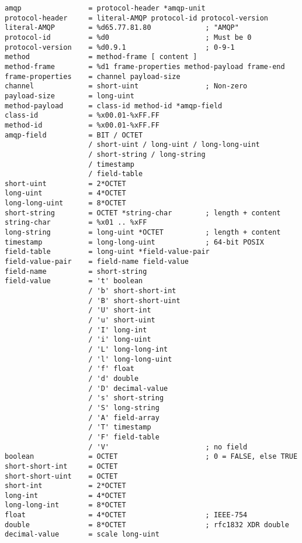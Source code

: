 \begin{verbatim}
amqp                = protocol-header *amqp-unit 
protocol-header     = literal-AMQP protocol-id protocol-version 
literal-AMQP        = %d65.77.81.80             ; "AMQP" 
protocol-id         = %d0                       ; Must be 0 
protocol-version    = %d0.9.1                   ; 0-9-1 
method              = method-frame [ content ] 
method-frame        = %d1 frame-properties method-payload frame-end 
frame-properties    = channel payload-size 
channel             = short-uint                ; Non-zero 
payload-size        = long-uint 
method-payload      = class-id method-id *amqp-field 
class-id            = %x00.01-%xFF.FF 
method-id           = %x00.01-%xFF.FF 
amqp-field          = BIT / OCTET 
                    / short-uint / long-uint / long-long-uint 
                    / short-string / long-string 
                    / timestamp 
                    / field-table 
short-uint          = 2*OCTET                   
long-uint           = 4*OCTET                   
long-long-uint      = 8*OCTET                   
short-string        = OCTET *string-char        ; length + content 
string-char         = %x01 .. %xFF 
long-string         = long-uint *OCTET          ; length + content 
timestamp           = long-long-uint            ; 64-bit POSIX 
field-table         = long-uint *field-value-pair 
field-value-pair    = field-name field-value 
field-name          = short-string
field-value         = 't' boolean
                    / 'b' short-short-int
                    / 'B' short-short-uint
                    / 'U' short-int
                    / 'u' short-uint
                    / 'I' long-int
                    / 'i' long-uint
                    / 'L' long-long-int
                    / 'l' long-long-uint
                    / 'f' float
                    / 'd' double
                    / 'D' decimal-value
                    / 's' short-string
                    / 'S' long-string
                    / 'A' field-array
                    / 'T' timestamp
                    / 'F' field-table
                    / 'V'                       ; no field 
boolean             = OCTET                     ; 0 = FALSE, else TRUE 
short-short-int     = OCTET 
short-short-uint    = OCTET 
short-int           = 2*OCTET                   
long-int            = 4*OCTET                   
long-long-int       = 8*OCTET                   
float               = 4*OCTET                   ; IEEE-754 
double              = 8*OCTET                   ; rfc1832 XDR double
decimal-value       = scale long-uint

\end{verbatim}

